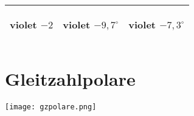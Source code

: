 \begin{center}
\begin{tabular}{|c|c|c|}
\hline
\begin{color}{violet} $-2$ \end{color} & \begin{color}{violet} $-9,7^{\circ}$ \end{color} & \begin{color}{violet} $-7,3^{\circ}$ \end{color}\\
\hline

\end{tabular}
\end{center}
\section{Gleitzahlpolare}
\texttt{[image: gzpolare.png]}
\newline
